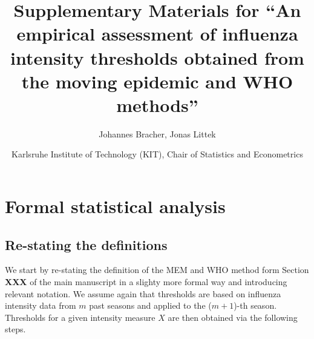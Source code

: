 \documentclass{article}
\begin{document}

\title{Supplementary Materials for ``An empirical assessment of influenza intensity thresholds obtained from the moving epidemic and WHO methods''}
\author{Johannes Bracher, Jonas Littek}
\date{ \small
Karlsruhe Institute of Technology (KIT), Chair of Statistics and Econometrics}

\maketitle

\section{Formal statistical analysis}

\subsection{Re-stating the definitions}
\label{sec:definitions}

We start by re-stating the definition of the MEM and WHO method form Section \textbf{XXX} of the main manuscript in a slighty more formal way and introducing relevant notation. We assume again that thresholds are based on influenza intensity data from $m$ past seasons and applied to the ($m + 1$)-th season. Thresholds for a given intensity measure $X$ are then obtained via the following steps.
\end{document}
